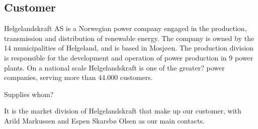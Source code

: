 \subsection{Customer}
Helgelandskraft AS is a Norwegian power company engaged in the production, transmission and distribution of renewable energy. The company is owned by the 14 municipalities of Helgeland, and is based in Mosjøen. The production division is responsible for the development and operation of power production in 9 power plants.
On a national scale Helgelandskraft is one of the greater? power companies, serving more than 44.000 customers.

Supplies whom?

It is the market division of Helgelandskraft that make up our customer, with Arild Markussen and Espen Skarsbø Olsen as our main contacts.
